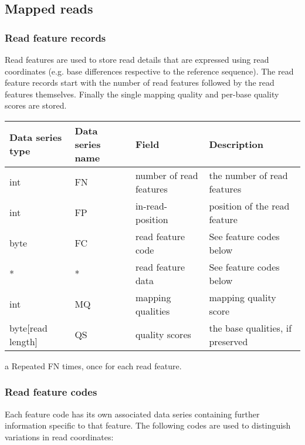 \documentclass[a4paper]{article}
\begin{document}
\subsection{\textbf{Mapped reads}}
\label{subsec:mapped}

\subsubsection*{\textbf{Read feature records}}
\label{subsec:features}

Read features are used to store read details that are expressed using read coordinates 
(e.g. base differences respective to the reference sequence). The read feature 
records start with the number of read features followed by the read features themselves.
Finally the single mapping quality and per-base quality scores are stored.

\begin{threeparttable}[t]
\begin{tabular}{|>{\raggedright}p{88pt}|>{\raggedright}p{83pt}|>{\raggedright}p{85pt}|>{\raggedright}p{180pt}|}
\hline
\textbf{Data series type} & \textbf{Data series name} & \textbf{Field} & \textbf{Description}\tabularnewline
\hline
int & FN & number of read features & the number of read features\tabularnewline
\hline
int & FP & in-read-position\tnote{a} & position of the read feature\tabularnewline 
\hline
byte & FC & read feature code\tnote{a} & See feature codes below\tabularnewline
\hline
* & * & read feature data\tnote{a} & See feature codes below\tabularnewline
\hline
int & MQ & mapping qualities & mapping quality score\tabularnewline
\hline
byte[read length] & QS & quality scores & the base qualities, if preserved\tabularnewline
\hline
\end{tabular}
\begin{tablenotes}
\item[a] Repeated FN times, once for each read feature.
\end{tablenotes}
\end{threeparttable}

\subsubsection*{Read feature codes}

Each feature code has its own associated data series containing further information specific to that feature.
The following codes are used to distinguish variations in read coordinates:
\end{document}
